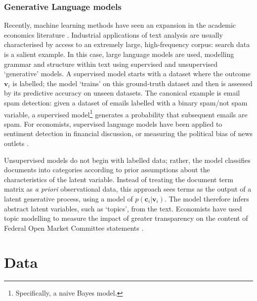 \documentclass{article}
\begin{document}
\subsubsection{Generative Language models}
Recently, machine learning methods have seen an expansion in the academic economics literature \parencite{atheyMachineLearningMethods2019a}. Industrial applications of text analysis are usually characterised by access to an extremely large, high-frequency corpus: search data is a salient example. In this case, large language models are used, modelling grammar and structure within text using supervised and unsupervised `generative' models. A supervised model starts with a dataset where the outcome \(\mathbf{v}_i\) is labelled; the model `trains' on this ground-truth dataset and then is assessed by its predictive accuracy on unseen datasets. The canonical example is email spam detection: given a dataset of emails labelled with a binary spam/not spam variable, a supervised model\footnote{Specifically, a naive Bayes model.} generates a probability that subsequent emails are spam. For economists, supervised language models have been applied to sentiment detection in financial discussion, or measuring the political bias of news outlets \parencite{grosecloseMeasureMediaBias2005}.

Unsupervised models do not begin with labelled data; rather, the model classifies documents into categories according to prior assumptions about the characteristics of the latent variable. Instead of treating the document term matrix as \textit{a priori} observational data, this approach sees terms as the output of a latent generative process, using a model of \(p(\mathbf{c}_i|\mathbf{v}_i)\). The model therefore infers abstract latent variables, such as `topics', from the text. Economists have used topic modelling to measure the impact of greater transparency on the content of Federal Open Market Committee statements \parencite{hansenTransparencyDeliberationFOMC2018}.



\section{Data}
\end{document}
